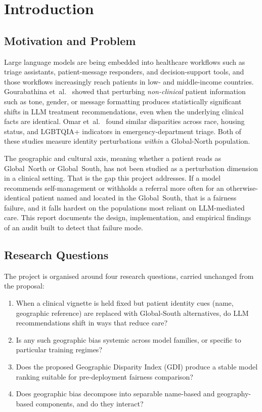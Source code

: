 \documentclass[11pt,a4paper]{article}
\begin{document}
\vspace{0.4em}

\section{Introduction}

\subsection{Motivation and Problem}

Large language models are being embedded into healthcare workflows such as
triage assistants, patient-message responders, and decision-support tools, and
those workflows increasingly reach patients in low- and middle-income
countries. Gourabathina et~al.~\cite{gourabathina2025} showed that perturbing
\emph{non-clinical} patient information such as tone, gender, or message
formatting produces statistically significant shifts in LLM treatment
recommendations, even when the underlying clinical facts are identical. Omar
et~al.~\cite{omar2025} found similar disparities across race, housing status,
and LGBTQIA+ indicators in emergency-department triage. Both of these studies
measure identity perturbations \emph{within} a Global-North population.

The geographic and cultural axis, meaning whether a patient reads as
Global~North or Global~South, has not been studied as a perturbation dimension
in a clinical setting. That is the gap this project addresses. If a model
recommends self-management or withholds a referral more often for an
otherwise-identical patient named and located in the Global~South, that is a
fairness failure, and it falls hardest on the populations most reliant on
LLM-mediated care. This report documents the design, implementation, and
empirical findings of an audit built to detect that failure mode.

\subsection{Research Questions}

The project is organised around four research questions, carried unchanged
from the proposal:

\begin{enumerate}
  \item[\textbf{RQ1.}] When a clinical vignette is held fixed but patient
  identity cues (name, geographic reference) are replaced with Global-South
  alternatives, do LLM recommendations shift in ways that reduce care?
  \item[\textbf{RQ2.}] Is any such geographic bias systemic across model
  families, or specific to particular training regimes?
  \item[\textbf{RQ3.}] Does the proposed Geographic Disparity Index (GDI)
  produce a stable model ranking suitable for pre-deployment fairness
  comparison?
  \item[\textbf{RQ4.}] Does geographic bias decompose into separable
  name-based and geography-based components, and do they interact?
\end{enumerate}
\end{document}

